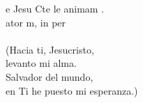 \begin{cancion}%
	e Jesu Cte le animam .\\
	ator m, in per\\
	\jump\\
(Hacia ti, Jesucristo, \\
 levanto mi alma.\\
 Salvador del mundo, \\
 en Ti he puesto mi esperanza.)\\
\end{cancion}%
